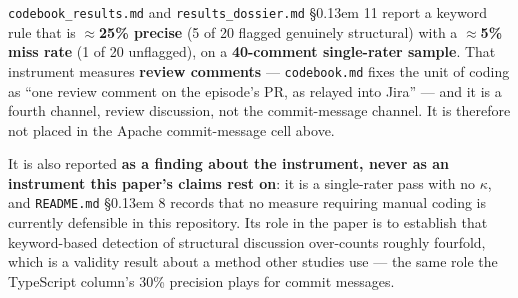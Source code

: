 \documentclass[11pt,a4paper]{article}
\begin{document}



\texttt{codebook\_\allowbreak{}results.\allowbreak{}md} and \texttt{results\_\allowbreak{}dossier.\allowbreak{}md} \S\kern0.13em 11 report a keyword rule that is \textbf{$\approx$25\% precise} (5 of 20 flagged genuinely structural) with a \textbf{$\approx$5\% miss rate} (1 of 20 unflagged), on a \textbf{40-comment single-rater sample}. That instrument measures \textbf{review comments} --- \texttt{codebook.\allowbreak{}md} fixes the unit of coding as ``one review comment on the episode's PR, as relayed into Jira'' --- and it is a fourth channel, review discussion, not the commit-message channel. It is therefore not placed in the Apache commit-message cell above.



It is also reported \textbf{as a finding about the instrument, never as an instrument this paper's claims rest on}: it is a single-rater pass with no $\kappa$, and \texttt{README.\allowbreak{}md} \S\kern0.13em 8 records that no measure requiring manual coding is currently defensible in this repository. Its role in the paper is to establish that keyword-based detection of structural discussion over-counts roughly fourfold, which is a validity result about a method other studies use --- the same role the TypeScript column's 30\% precision plays for commit messages.



\begingroup\footnotesize\setlength{\tabcolsep}{3pt}
\end{document}
